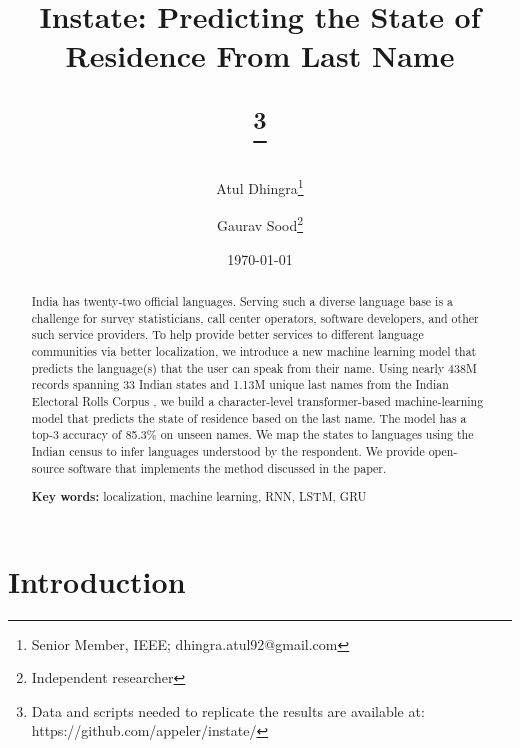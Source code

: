 \documentclass[11pt,  letterpaper]{article}
\title{Instate: Predicting the State of Residence From Last Name

\thanks{Data and scripts needed to replicate the results are available at: https://github.com/appeler/instate/}}
\author{Atul Dhingra\thanks{Senior Member, IEEE; \textsf{dhingra.atul92@gmail.com}} \and Gaurav Sood\thanks{Independent researcher}}
\date{\today}
\begin{document}
\maketitle

\begin{abstract}

India has twenty-two official languages. Serving such a diverse language base is a challenge for survey statisticians, call center operators, software developers, and other such service providers. To help provide better services to different language communities via better localization, we introduce a new machine learning model that predicts the language(s) that the user can speak from their name. Using nearly 438M records spanning 33 Indian states and 1.13M unique last names from the Indian Electoral Rolls Corpus \citep{DVN/OG47IV_2023}, we build a character-level transformer-based machine-learning model that predicts the state of residence based on the last name. The model has a top-3 accuracy of 85.3\% on unseen names. We map the states to languages using the Indian census to infer languages understood by the respondent. We provide open-source software that implements the method discussed in the paper.

\smallskip

\textbf{Key words:} localization, machine learning, RNN, LSTM, GRU


\end{abstract}








\section{Introduction}
\end{document}
